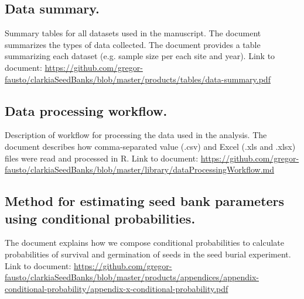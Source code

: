 \documentclass[12pt, oneside, titlepage]{article}   	%
\begin{document}
\subsection*{Data summary.} Summary tables for all datasets used in the manuscript. The document summarizes the types of data collected. The document provides a table summarizing each dataset (e.g. sample size per each site and year). Link to document: \url{https://github.com/gregor-fausto/clarkiaSeedBanks/blob/master/products/tables/data-summary.pdf}

\subsection*{Data processing workflow.} Description of workflow for processing the data used in the analysis. The document describes how comma-separated value (.csv) and Excel (.xls and .xlsx) files were read and processed in R. Link to document: \url{https://github.com/gregor-fausto/clarkiaSeedBanks/blob/master/library/dataProcessingWorkflow.md}

\subsection*{Method for estimating seed bank parameters using conditional probabilities.} The document explains how we compose conditional probabilities to calculate probabilities of survival and germination of seeds in the seed burial experiment. Link to document: \url{https://github.com/gregor-fausto/clarkiaSeedBanks/blob/master/products/appendices/appendix-conditional-probability/appendix-x-conditional-probability.pdf}
\end{document}
